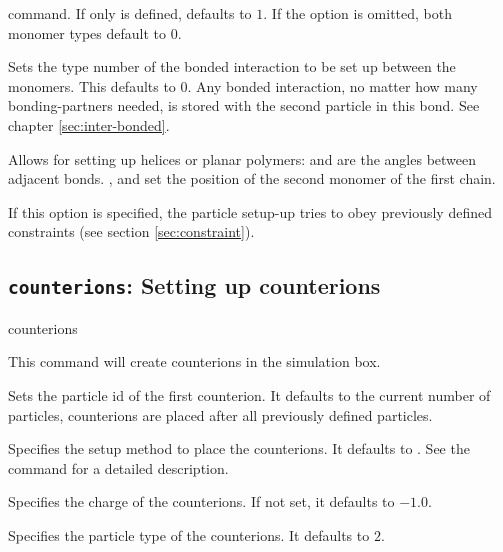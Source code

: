 \begin{arguments}
    command. If only  is defined,
     defaults to $1$. If the option is
    omitted, both monomer types default to $0$.
  \item[\opt{bond \var{bondid}}] Sets the type number of the bonded
    interaction to be set up between the monomers. This defaults to
    $0$.  Any bonded interaction, no matter how many bonding-partners
    needed, is stored with the second particle in this bond. See
    chapter \ref{sec:inter-bonded}.
  \item[\opt{angle \var{\phi} [\var{\theta} [\var{x} \var{y}
      \var{z}]]}] Allows for setting up helices or planar polymers:
    \var{\phi} and  are the angles between adjacent bonds.
    ,  and  set the position of the second
    monomer of the first chain.
  \item[\opt{constraints}] If this option is specified, the particle setup-up
  tries to obey previously defined constraints (see section \vref{sec:constraint}).
\end{arguments}

\subsection{\texttt{counterions}: Setting up counterions}
\begin{essyntax}
  counterions
  \begin{features}
  \end{features}
\end{essyntax}
This command will create  counterions in the simulation box.
\begin{arguments}
\item[\opt{start \var{pid}}] Sets the particle id of the first
  counterion.  It defaults to the current number of particles, \ie
  counterions are placed after all previously defined particles.
\item[\opt{mode \alt{SAW \asep RW} \opt{\var{shield}
      \opt{\var{try_\mathrm{max}} }}}] Specifies the setup method to
  place the counterions. It defaults to . See the
   command for a detailed description.
\item[\opt{charge \var{val}}] Specifies the charge of the counterions.
  If not set, it defaults to $-1.0$.
\item[\opt{type \var{typeid}}] Specifies the particle type of the
  counterions. It defaults to $2$.
\end{arguments}

